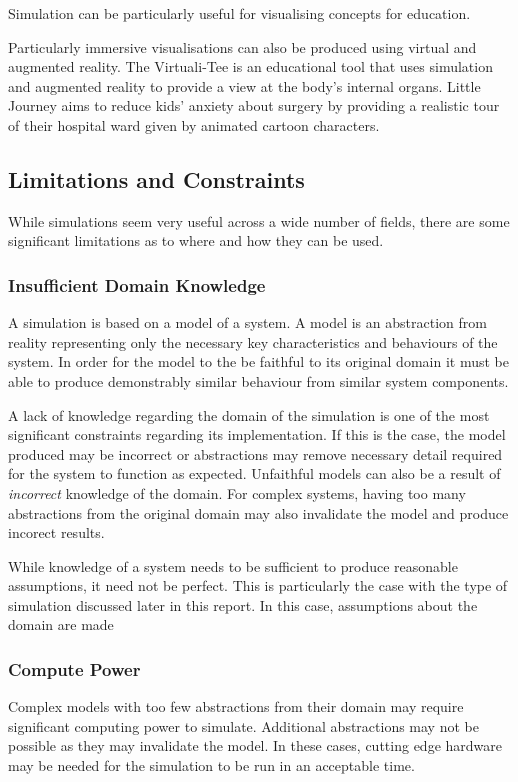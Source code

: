 \documentclass{UoYCSproject}
\begin{document}
Simulation can be particularly useful for visualising concepts for education. 

Particularly immersive visualisations can also be produced using virtual and augmented reality. The Virtuali-Tee is an educational tool that uses simulation and augmented reality to provide a view at the body's internal organs\cite{curiscope}. Little Journey aims to reduce kids' anxiety about surgery by providing a realistic tour of their hospital ward given by animated cartoon characters\cite{little_journey}.

\subsection{Limitations and Constraints}
While simulations seem very useful across a wide number of fields, there are some significant limitations as to where and how they can be used.

\subsubsection{Insufficient Domain Knowledge}
\label{domain_knowledge}
A simulation is based on a model of a system.
A model is an abstraction from reality representing only the necessary key characteristics and behaviours of the system.
In order for the model to the be faithful to its original domain it must be able to produce demonstrably similar behaviour from similar system components.

A lack of knowledge regarding the domain of the simulation is one of the most significant constraints regarding its implementation.
If this is the case, the model produced may be incorrect or abstractions may remove necessary detail required for the system to function as expected.
Unfaithful models can also be a result of \textit{incorrect} knowledge of the domain.
For complex systems, having too many abstractions from the original domain may also invalidate the model and produce incorect results\cite[p.8]{cosmos}.

While knowledge of a system needs to be sufficient to produce reasonable assumptions, it need not be perfect.
This is particularly the case with the type of simulation discussed later in this report.
In this case, assumptions about the domain are made %

\subsubsection{Compute Power}
Complex models with too few abstractions from their domain may require significant computing power to simulate. Additional abstractions may not be possible as they may invalidate the model. In these cases, cutting edge hardware may be needed for the simulation to be run in an acceptable time. 
\end{document}
